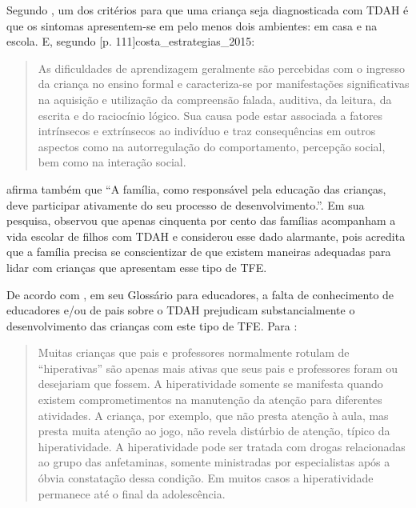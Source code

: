 \documentclass{textolivre}
\begin{document}
Segundo \textcite{goncalves_inclusao_2019}, um dos critérios para que uma criança seja diagnosticada com TDAH é que os sintomas apresentem-se em pelo menos dois ambientes: em casa e na escola. E, segundo [p. 111]{costa_estrategias_2015}: 

\begin{quote}
    As dificuldades de aprendizagem geralmente são percebidas com o ingresso da criança no ensino formal e caracteriza-se por manifestações significativas na aquisição e utilização da compreensão falada, auditiva, da leitura, da escrita e do raciocínio lógico. Sua causa pode estar associada a fatores intrínsecos e extrínsecos ao indivíduo e traz consequências em outros aspectos como na autorregulação do comportamento, percepção social, bem como na interação social.
\end{quote}

\textcite[p. 48]{goncalves_inclusao_2019} afirma também que “A família, como responsável pela educação das crianças, deve participar ativamente do seu processo de desenvolvimento.”. Em sua pesquisa, \textcite{goncalves_inclusao_2019} observou que apenas cinquenta por cento das famílias acompanham a vida escolar de filhos com TDAH e considerou esse dado alarmante, pois acredita que a família precisa se conscientizar de que existem maneiras adequadas para lidar com crianças que apresentam esse tipo de TFE.  

De acordo com \textcite{antunes_glossario_2001}, em seu Glossário para educadores, a falta de conhecimento de educadores e/ou de pais sobre o TDAH prejudicam substancialmente o desenvolvimento das crianças com este tipo de TFE. Para \textcite[p. 140]{antunes_glossario_2001}:

\begin{quote}
    Muitas crianças que pais e professores normalmente rotulam de “hiperativas” são apenas mais ativas que seus pais e professores foram ou desejariam que fossem. A hiperatividade somente se manifesta quando existem comprometimentos na manutenção da atenção para diferentes atividades.  A criança, por exemplo, que não presta atenção à aula, mas presta muita atenção ao jogo, não revela distúrbio de atenção, típico da hiperatividade. A hiperatividade pode ser tratada com drogas relacionadas ao grupo das anfetaminas, somente ministradas por especialistas após a óbvia constatação dessa condição. Em muitos casos a hiperatividade permanece até o final da adolescência.
\end{quote}
\end{document}
